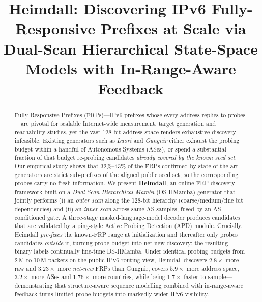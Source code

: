 \documentclass[conference]{IEEEtran}
\begin{document}
\title{Heimdall: Discovering IPv6 Fully-Responsive Prefixes at Scale via
       Dual-Scan Hierarchical State-Space Models with In-Range-Aware
       Feedback}

\author{
}

\maketitle

\begin{abstract}
Fully-Responsive Prefixes (FRPs)---IPv6 prefixes whose every address
replies to probes---are pivotal for scalable Internet-wide measurement,
target generation and reachability studies, yet the vast 128-bit
address space renders exhaustive discovery infeasible.  Existing
generators such as \emph{Luori} and \emph{Gungnir} either exhaust
the probing budget within a handful of Autonomous Systems (ASes),
or spend a substantial fraction of that budget re-probing
candidates \emph{already covered by the known seed set}.  Our
empirical study shows that $32\%$--$43\%$ of the FRPs confirmed by
state-of-the-art generators are strict sub-prefixes of the aligned
public seed set, so the corresponding probes carry no fresh
information.  We present \textbf{Heimdall}, an online FRP-discovery
framework built on a \emph{Dual-Scan Hierarchical Mamba}
(DS-HMamba) generator that jointly performs (i) an \emph{outer scan}
along the 128-bit hierarchy (coarse/medium/fine bit dependencies)
and (ii) an \emph{inner scan} across same-AS samples, fused by an
AS-conditioned gate.  A three-stage masked-language-model decoder
produces candidates that are validated by a ping-style Active
Probing Detection (APD) module.  Crucially, Heimdall \emph{pre-fixes}
the known-FRP range at initialization and thereafter only probes
candidates \emph{outside} it, turning probe budget into net-new
discovery; the resulting binary labels continually fine-tune
DS-HMamba.  Under identical probing budgets from 2\,M to 10\,M
packets on the public IPv6 routing view, Heimdall discovers
$\mathbf{2.8\times}$ more raw and $\mathbf{3.23\times}$ more
\emph{net-new} FRPs than Gungnir, covers $\mathbf{5.9\times}$ more
address space, $\mathbf{3.2\times}$ more ASes and
$\mathbf{1.76\times}$ more countries, while being
$\mathbf{1.7\times}$ faster to sample---demonstrating that
structure-aware sequence modelling combined with in-range-aware
feedback turns limited probe budgets into markedly wider IPv6
visibility.
\end{abstract}
\end{document}
